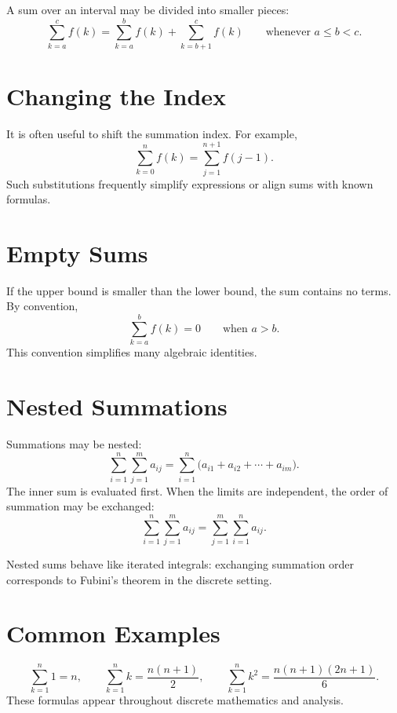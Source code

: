 \begin{remark*}
A sum over an interval may be divided into smaller pieces:
\[
\sum_{k=a}^{c} f(k)
=
\sum_{k=a}^{b} f(k)
+
\sum_{k=b+1}^{c} f(k)
\qquad \text{whenever } a \le b < c.
\]
\end{remark*}

\section*{Changing the Index}

\begin{remark*}
It is often useful to shift the summation index. For example,
\[
\sum_{k=0}^{n} f(k) = \sum_{j=1}^{n+1} f(j-1).
\]
Such substitutions frequently simplify expressions or align sums
with known formulas.
\end{remark*}

\section*{Empty Sums}

\begin{remark*}
If the upper bound is smaller than the lower bound, the sum contains
no terms. By convention,
\[
\sum_{k=a}^{b} f(k) = 0 \qquad \text{when } a > b.
\]
This convention simplifies many algebraic identities.
\end{remark*}

\section*{Nested Summations}

\begin{remark*}
Summations may be nested:
\[
\sum_{i=1}^{n} \sum_{j=1}^{m} a_{ij}
= \sum_{i=1}^{n}\bigl(a_{i1} + a_{i2} + \cdots + a_{im}\bigr).
\]
The inner sum is evaluated first. When the limits are independent,
the order of summation may be exchanged:
\[
\sum_{i=1}^{n}\sum_{j=1}^{m} a_{ij}
=
\sum_{j=1}^{m}\sum_{i=1}^{n} a_{ij}.
\]
\end{remark*}

\begin{remark*}
Nested sums behave like iterated integrals: exchanging summation order
corresponds to Fubini's theorem in the discrete setting.
\end{remark*}

\section*{Common Examples}

\begin{remark*}
\[
\sum_{k=1}^{n} 1 = n, \qquad
\sum_{k=1}^{n} k = \frac{n(n+1)}{2}, \qquad
\sum_{k=1}^{n} k^2 = \frac{n(n+1)(2n+1)}{6}.
\]
These formulas appear throughout discrete mathematics and analysis.
\end{remark*}
